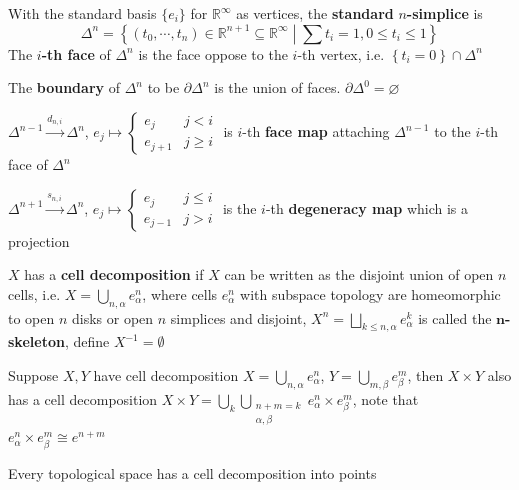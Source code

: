 \documentclass[main]{subfiles}
\begin{document}
\begin{definition}\label{Standard simplex}
With the standard basis $\{e_i\}$ for $\mathbb R^\infty$ as vertices, the \textbf{standard} $n$\textbf{-simplice} is
\[\Delta^n=\left\{(t_0,\cdots,t_n)\in\mathbb R^{n+1}\subseteq\mathbb R^\infty\middle|\sum t_i=1,0\leq t_i\leq1\right\}\]
The $i$\textbf{-th face} of $\Delta^n$ is the face oppose to the $i$-th vertex, i.e. $\left\{t_i=0\right\}\cap\Delta^n$ \par
The \textbf{boundary} of $\Delta^n$ to be $\partial\Delta^n$ is the union of faces. $\partial \Delta^0=\varnothing$
\begin{center}
\end{center}
$\Delta^{n-1}\xrightarrow{d_{n,i}}\Delta^{n}$, $e_j\mapsto\begin{cases}
e_j &j<i \\
e_{j+1} &j\geq i
\end{cases}$ is $i$-th \textbf{face map} attaching $\Delta^{n-1}$ to the $i$-th face of $\Delta^n$ \par
$\Delta^{n+1}\xrightarrow{s_{n,i}}\Delta^n$, $e_j\mapsto\begin{cases}
e_j &j\leq i \\
e_{j-1} &j>i
\end{cases}$ is the $i$-th \textbf{degeneracy map} which is a projection
\end{definition}

\begin{definition}
$X$ has a \textbf{cell decomposition} if $X$ can be written as the disjoint union of open $n$ cells, i.e. $\displaystyle X=\bigcup_{n,\alpha}e^n_\alpha$, where cells $e^n_\alpha$ with subspace topology are homeomorphic to open $n$ disks or open $n$ simplices and disjoint, $\displaystyle X^n=\bigsqcup_{k\leq n,\alpha}e^k_\alpha$ is called the $\mathbf{n}$\textbf{-skeleton}, define $X^{-1}=\emptyset$ \par
Suppose $X,Y$ have cell decomposition $\displaystyle X=\bigcup_{n,\alpha}e^n_\alpha$, $\displaystyle Y=\bigcup_{m,\beta}e^m_\beta$, then $X\times Y$ also has a cell decomposition $\displaystyle X\times Y=\bigcup_{k}\bigcup_{\substack{n+m=k \\ \alpha,\beta}}e^n_\alpha\times e^m_\beta$, note that $e^n_\alpha\times e^m_\beta\cong e^{n+m}$ \par
Every topological space has a cell decomposition into points
\end{definition}
\end{document}
